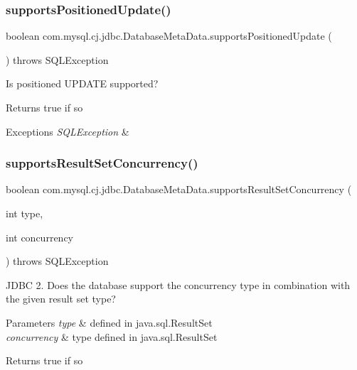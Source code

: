 \subsubsection{\texorpdfstring{supports\+Positioned\+Update()}{supportsPositionedUpdate()}}
{\footnotesize\ttfamily boolean com.\+mysql.\+cj.\+jdbc.\+Database\+Meta\+Data.\+supports\+Positioned\+Update (\begin{DoxyParamCaption}{ }\end{DoxyParamCaption}) throws S\+Q\+L\+Exception}

Is positioned U\+P\+D\+A\+TE supported?

\begin{DoxyReturn}{Returns}
true if so 
\end{DoxyReturn}

\begin{DoxyExceptions}{Exceptions}
{\em S\+Q\+L\+Exception} & \\
\hline
\end{DoxyExceptions}
\mbox{\label{classcom_1_1mysql_1_1cj_1_1jdbc_1_1_database_meta_data_a642e1d8dc7574859b8cfc640e889ff58}} 
\subsubsection{\texorpdfstring{supports\+Result\+Set\+Concurrency()}{supportsResultSetConcurrency()}}
{\footnotesize\ttfamily boolean com.\+mysql.\+cj.\+jdbc.\+Database\+Meta\+Data.\+supports\+Result\+Set\+Concurrency (\begin{DoxyParamCaption}\item[{int}]{type,  }\item[{int}]{concurrency }\end{DoxyParamCaption}) throws S\+Q\+L\+Exception}

J\+D\+BC 2. Does the database support the concurrency type in combination with the given result set type?


\begin{DoxyParams}{Parameters}
{\em type} & defined in java.\+sql.\+Result\+Set \\
\hline
{\em concurrency} & type defined in java.\+sql.\+Result\+Set \\
\hline
\end{DoxyParams}
\begin{DoxyReturn}{Returns}
true if so 
\end{DoxyReturn}

